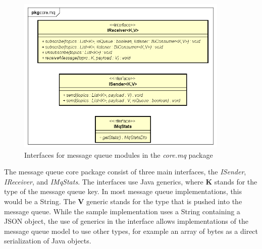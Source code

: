 \begin{figure}[!ht]
	\centering
	\includegraphics[width=0.9\textwidth]{figures/03_design/core-mq-module}
    \caption{Interfaces for message queue modules in the \textit{core.mq} package}
    \label{fig:code-mq-module}
\end{figure}

The message queue core package consist of three main interfaces, the \textit{ISender}, \textit{IReceiver}, and \textit{IMqStats}. The interfaces use Java generics, where \textbf{K} stands for the type of the message queue key. In most message queue implementations, this would be a String. The \textbf{V} generic stands for the type that is pushed into the message queue. While the sample implementation uses a String containing a JSON object, the use of generics in the interface allows implementations of the message queue model to use other types, for example an array of bytes as a direct serialization of Java objects.
